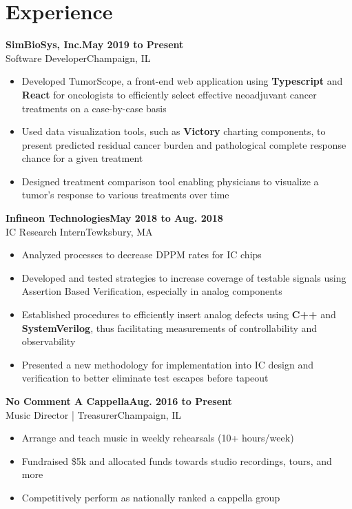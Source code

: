 \documentclass[9pt]{extarticle}
\newcommand{\experiencesubsection}[4]{
    \vspace{0.75em}\large\textbf{#1\hfill{#4}}\\{#2}\hfill{#3}\normalsize
}
\begin{document}
\hfill\begin{minipage}[t]{.7\textwidth}  %
    \section{Experience}
    \experiencesubsection{SimBioSys, Inc.}{Software Developer}{Champaign, IL}{May 2019 to Present}
    \begin{itemize}
        \setlength\itemsep{1dd}
        \item Developed TumorScope, a front-end web application using \textbf{Typescript} and \textbf{React} for oncologists to efficiently select effective neoadjuvant cancer treatments on a case-by-case basis
        \item Used data visualization tools, such as \textbf{Victory} charting components, to present predicted residual cancer burden and pathological complete response chance for a given treatment
        \item Designed treatment comparison tool enabling physicians to visualize a tumor's response to various treatments over time
    \end{itemize}

    \experiencesubsection{Infineon Technologies}{IC Research Intern}{Tewksbury, MA}{May 2018 to Aug. 2018}
    \begin{itemize}
        \setlength\itemsep{1dd}
        \item Analyzed processes to decrease DPPM rates for IC chips
        \item Developed and tested strategies to increase coverage of testable signals using Assertion Based Verification, especially in analog components
        \item Established procedures to efficiently insert analog defects using \textbf{C++} and \textbf{SystemVerilog}, thus facilitating measurements of controllability and observability 
        \item Presented a new methodology for implementation into IC design and verification to better eliminate test escapes before tapeout
    \end{itemize}

    \experiencesubsection{No Comment A Cappella}{Music Director | Treasurer}{Champaign, IL}{Aug. 2016 to Present}
    \begin{itemize}
        \setlength\itemsep{1dd}
        \item Arrange and teach music in weekly rehearsals (10+ hours/week)
        \item Fundraised \$5k and allocated funds towards studio recordings, tours, and more
        \item Competitively perform as nationally ranked a cappella group
    \end{itemize}


\end{minipage}
\end{document}
